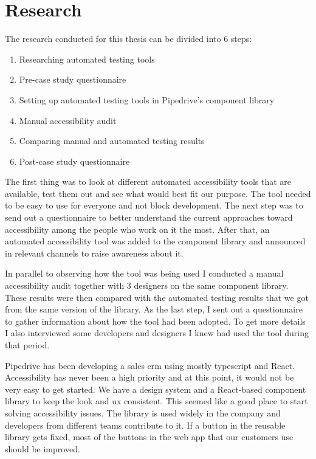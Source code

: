 \documentclass{master_thesis}
\begin{document}
\section{Research}


The research conducted for this thesis can be divided into 6 steps:

\begin{enumerate}
	\item Researching automated testing tools
	\item Pre-case study questionnaire
	\item Setting up automated testing tools in Pipedrive's component library
	\item Manual accessibility audit
	\item Comparing manual and automated testing results
	\item Post-case study questionnaire
\end{enumerate}

The first thing was to look at different automated accessibility tools that are available, test them out and see what would best fit our purpose. The tool needed to be easy to use for everyone and not block development. The next step was to send out a questionnaire to better understand the current approaches toward accessibility among the people who work on it the most. After that, an automated accessibility tool was added to the component library and announced in relevant channels to raise awareness about it.

In parallel to observing how the tool was being used I conducted a manual accessibility audit together with 3 designers on the same component library. These results were then compared with the automated testing results that we got from the same version of the library. As the last step, I sent out a questionnaire to gather information about how the tool had been adopted. To get more details I also interviewed some developers and designers I knew had used the tool during that period.

Pipedrive has been developing a sales \ac{crm} using mostly typescript and React. Accessibility has never been a high priority and at this point, it would not be very easy to get started. We have a design system and a React-based component library to keep the look and \ac{ux} consistent. This seemed like a good place to start solving accessibility issues. The library is used widely in the company and developers from different teams contribute to it. If a button in the reusable library gets fixed, most of the buttons in the web app that our customers use should be improved.
\end{document}
